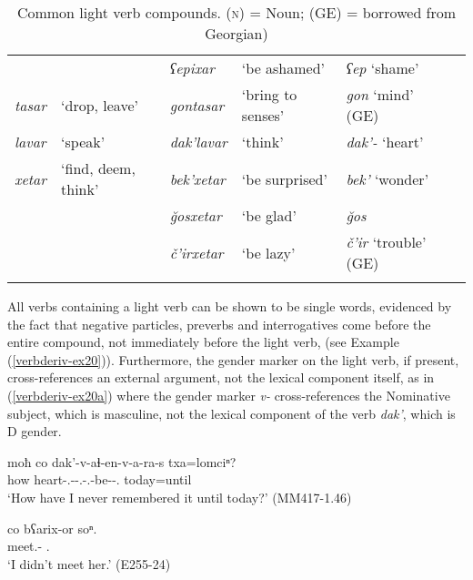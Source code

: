 \begin{table}
\begin{tabular}{l@{~}l l@{~}l l@{~}l}
		& & \textit{ʕepixar} & `be ashamed' & \textit{ʕep} `shame' \\
		
		\textit{tasar} & `drop, leave' & \textit{gontasar} & `bring to senses' & \textit{gon} `mind' (GE) \\
		
		\textit{lavar} & `speak' & \textit{dak'lavar} & `think' & \textit{dak'-} `heart' \\
		
		\textit{xetar} & `find, deem, think' & \textit{bek'xetar}	& `be surprised' & \textit{bek'} `wonder' \\
		& & \textit{\u{g}osxetar} & `be glad' & \textit{\u{g}os} \\
		& & \textit{č'irxetar} & `be lazy' & \textit{č'ir} `trouble' (GE) \\
		\lspbottomrule
	\end{tabular}
	\caption{Common light verb compounds. (\textsc{n}) = Noun; (GE) = borrowed from Georgian)}
	\label{verbderiv-table-lightverbs}
\end{table}


All verbs containing a light verb can be shown to be single words, evidenced by the fact that negative particles, preverbs and interrogatives come before the entire compound, not immediately before the light verb, (see Example (\ref{verbderiv-ex20})). Furthermore, the gender marker on the light verb, if present, cross-references an external argument, not the lexical component itself, as in (\ref{verbderiv-ex20a}) where the gender marker \textit{v-} cross-references the Nominative subject, which is masculine, not the lexical component of the verb \textit{dak'}, which is D gender. 

\begin{exe}
	\ex\label{verbderiv-ex20}
	\begin{xlist}
		
		
			\ex\label{verbderiv-ex20a}
			\gll moħ co dak'-v-aɬ-en-v-a-ra-s txa=lomciⁿ?  \\
			how {\Neg} heart-{\M}.{\Sg}-{\Lv}-{\Ptcp}.{\Pst}-{\M}.{\Sg}-be-{\Imprf}-{\Fsg}.{\Nom} today=until \\
			\trans `How have I never remembered it until today?'
			\hfill (MM417-1.46)
		
		
		
			\ex\label{verbderiv-ex20b}
			\gll co bʕarix-or soⁿ. \\
			{\Neg} meet.{\Ipfv}-{\Imprf} {\Fsg}.{\Dat} \\
			\trans `I didn't meet her.'
			\hfill (E255-24)
		
		
	\end{xlist}
\end{exe}


